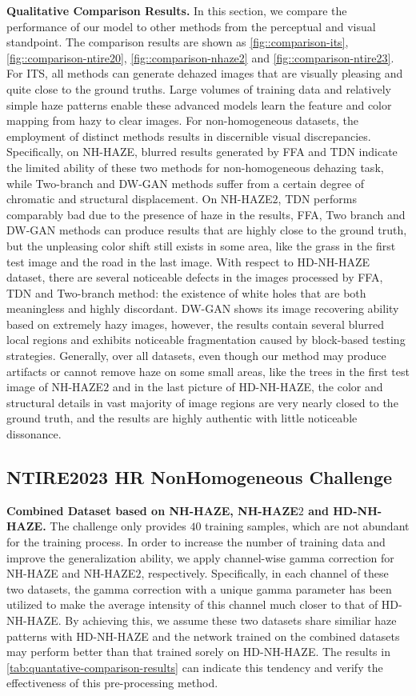 \documentclass[10pt,twocolumn,letterpaper]{article}
\begin{document}
\textbf{Qualitative Comparison Results.}
In this section, we compare the performance of our model to other methods from the perceptual and visual standpoint. The comparison results are shown as \cref{fig::comparison-its}, \cref{fig::comparison-ntire20}, \cref{fig::comparison-nhaze2} and \cref{fig::comparison-ntire23}. For ITS, all methods can generate dehazed images that are visually pleasing and quite close to the ground truths. Large volumes of training data and relatively simple haze patterns enable these advanced models learn the feature and color mapping from hazy to clear images. For non-homogeneous datasets, the employment of distinct methods results in discernible visual discrepancies. Specifically, on NH-HAZE, blurred results generated by FFA and TDN indicate the limited ability of these two methods for non-homogeneous dehazing task, while Two-branch and DW-GAN methods suffer from a certain degree of chromatic and structural displacement. On NH-HAZE$2$, TDN performs comparably bad due to the presence of haze in the results, FFA, Two branch and DW-GAN methods can produce results that are highly close to the ground truth, but the unpleasing color shift still exists in some area, like the grass in the first test image and the road in the last image. With respect to HD-NH-HAZE dataset, there are several noticeable defects in the images processed by FFA, TDN and Two-branch method: the existence of white holes that are both meaningless and highly discordant. DW-GAN shows its image recovering ability based on extremely hazy images, however, the results contain several blurred local regions and exhibits noticeable fragmentation caused by block-based testing strategies. Generally, over all datasets, even though our method may produce artifacts or cannot remove haze on some small areas, like the trees in the first test image of NH-HAZE$2$ and in the last picture of HD-NH-HAZE, the color and structural details in vast majority of image regions are very nearly closed to the ground truth, and the results are highly authentic with little noticeable dissonance.

\subsection{NTIRE2023 HR NonHomogeneous Challenge}
\label{sec:ntire23-chanllenge}
\textbf{Combined Dataset based on NH-HAZE, NH-HAZE$2$ and HD-NH-HAZE.} The challenge only provides $40$ training samples, which are not abundant for the training process. In order to increase the number of training data and improve the generalization ability, we apply channel-wise gamma correction for NH-HAZE and NH-HAZE$2$, respectively. Specifically, in each channel of these two datasets, the gamma correction with a unique gamma parameter has been utilized to make the average intensity of this channel much closer to that of HD-NH-HAZE. By achieving this, we assume these two datasets share similiar haze patterns with HD-NH-HAZE and the network trained on the combined datasets may perform better than that trained sorely on HD-NH-HAZE. The results in \cref{tab:quantative-comparison-results} can indicate this tendency and verify the effectiveness of this pre-processing method.
\end{document}
